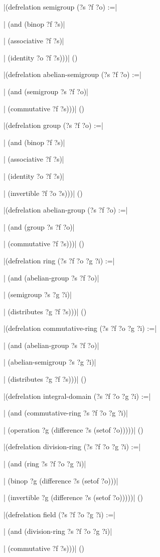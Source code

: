 \verbatim|(defrelation semigroup (?s ?f ?o) :=|\par
\verbatim|  (and (binop ?f ?s)|\par
\verbatim|       (associative ?f ?s)|\par
\verbatim|       (identity ?o ?f ?s)))|
\hfill(\equation)\par
\bigskip
\verbatim|(defrelation abelian-semigroup (?s ?f ?o) :=|\par
\verbatim|  (and (semigroup ?s ?f ?o)|\par
\verbatim|       (commutative ?f ?s)))|
\hfill(\equation)\par
\bigskip
\verbatim|(defrelation group (?s ?f ?o) :=|\par
\verbatim|  (and (binop ?f ?s)|\par
\verbatim|       (associative ?f ?s)|\par
\verbatim|       (identity ?o ?f ?s)|\par
\verbatim|       (invertible ?f ?o ?s)))|
\hfill(\equation)\par
\bigskip
\verbatim|(defrelation abelian-group (?s ?f ?o) :=|\par
\verbatim|  (and (group ?s ?f ?o)|\par
\verbatim|       (commutative ?f ?s)))|
\hfill(\equation)\par
\bigskip
\verbatim|(defrelation ring (?s ?f ?o ?g ?i) :=|\par
\verbatim|  (and (abelian-group ?s ?f ?o)|\par
\verbatim|       (semigroup ?s ?g ?i)|\par
\verbatim|       (distributes ?g ?f ?s)))|
\hfill(\equation)\par
\bigskip
\verbatim|(defrelation commutative-ring (?s ?f ?o ?g ?i) :=|\par
\verbatim|  (and (abelian-group ?s ?f ?o)|\par
\verbatim|       (abelian-semigroup ?s ?g ?i)|\par
\verbatim|       (distributes ?g ?f ?s)))|
\hfill(\equation)\par
\bigskip
\verbatim|(defrelation integral-domain (?s ?f ?o ?g ?i) :=|\par
\verbatim|  (and (commutative-ring ?s ?f ?o ?g ?i)|\par
\verbatim|       (operation ?g (difference ?s (setof ?o)))))|
\hfill(\equation)\par
\bigskip
\verbatim|(defrelation division-ring (?s ?f ?o ?g ?i) :=|\par
\verbatim|  (and (ring ?s ?f ?o ?g ?i)|\par
\verbatim|       (binop ?g (difference ?s (setof ?o)))|\par
\verbatim|       (invertible ?g (difference ?s (setof ?o)))))|
\hfill(\equation)\par
\bigskip
\verbatim|(defrelation field (?s ?f ?o ?g ?i) :=|\par
\verbatim|  (and (division-ring ?s ?f ?o ?g ?i)|\par
\verbatim|       (commutative ?f ?s)))|
\hfill(\equation)\par
\bigskip

